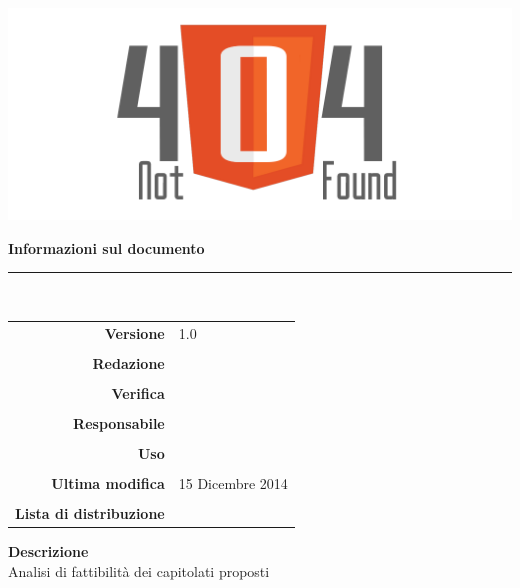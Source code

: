 \thispagestyle{empty}

\begin{titlepage}
	\begin{center}
	\begin{Huge}
		\textbf{\gruppo} \\
	\end{Huge}
	\vspace{0.5cm}
	\begin{Large}
		\textbf{\capitolato}
	\end{Large}
	
	\vspace{1cm}
    
	\includegraphics[scale=0.35]{../logo/logo404_Extends.png}
	\vspace{1cm}
	\begin{Huge}
		\textbf{\titDoc}
	\end{Huge}
	
	\vspace{1cm}
	\textbf{Informazioni sul documento}\\
    \rule{10cm}{.4pt} \\
	\begin{table}[h]
	\begin{center}
	\begin{tabular}{r | l}
		\textbf{Versione} & 1.0 \\ \\
		\textbf{Redazione} & \CaMa \\ \\
		\textbf{Verifica} &\GoIs \\ \\
		\textbf{Responsabile} & \VeFe \\ \\
		\textbf{Uso} & \uso \\ \\
		\textbf{Ultima modifica} & 15 Dicembre 2014 \\ \\
		\textbf{Lista di distribuzione} & \gruppo \\ 
	\end{tabular}
	\end{center}
	\end{table}
			\textbf{Descrizione} \\
			Analisi di fattibilità dei capitolati proposti
	\end{center}
\end{titlepage}